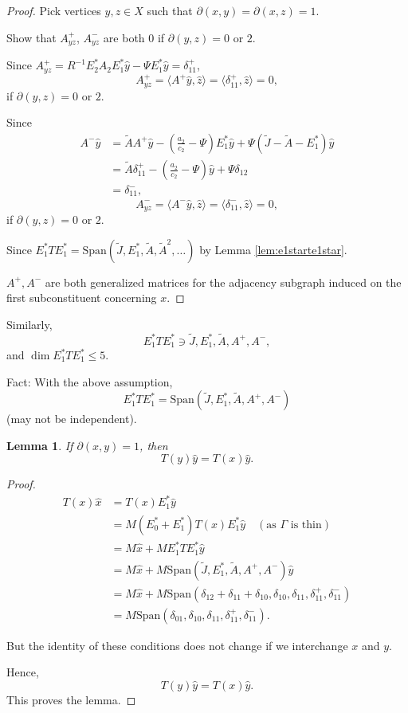 \documentclass[
]{book}
\newtheorem{lemma}{Lemma}[chapter]
\theoremstyle{definition}
\theoremstyle{definition}
\theoremstyle{definition}
\theoremstyle{definition}
\theoremstyle{remark}
\begin{document}
\begin{proof}
Pick vertices \(y,z\in X\) such that \(\partial(x,y) = \partial(x,z) = 1\).

Show that \(A^+_{yz}\), \(A^-_{yz}\) are both \(0\) if \(\partial(y,z) = 0\) or \(2\).

Since \(A^+_{yz} = R^{-1}E^*_2A_2E^*_1\hat{y} - \Psi E^*_1\hat{y} = \delta^+_{11}\),
\[A^+_{yz} = \langle A^+\hat{y}, \hat{z}\rangle = \langle \delta^+_{11},\hat{z}\rangle = 0,\]
if \(\partial(y,z) = 0\) or \(2\).

Since
\begin{align}
A^-\hat{y} & = \tilde{A}A^+\hat{y} - \left(\frac{a_2}{c_2}-\Psi\right)E^*_1\hat{y} + \Psi(\tilde{J} - \tilde{A} - E^*_1)\hat{y}\\
& = \tilde{A}\delta^+_{11} - \left(\frac{a_2}{c_2}-\Psi\right)\hat{y} + \Psi\delta_{12}\\
& = \delta^-_{11},
\end{align}
\[A^-_{yz} = \langle A^-\hat{y}, \hat{z}\rangle = \langle \delta^-_{11}, \hat{z}\rangle = 0,\]
if \(\partial(y,z) = 0\) or \(2\).

Since \(E^*_1TE^*_1 = \mathrm{Span}(\tilde{J},E^*_1, \tilde{A}, \tilde{A}^2, \ldots)\) by Lemma \ref{lem:e1starte1star}.

\(A^+, A^-\) are both generalized matrices for the adjacency subgraph induced on the first subconstituent concerning \(x\).
\end{proof}

Similarly,
\[E^*_1TE^*_1 \ni \tilde{J}, E^*_1, \tilde{A}, A^+, A^-,\]
and \(\dim E^*_1TE^*_1 \leq 5\).

Fact: With the above assumption,
\[E^*_1TE^*_1 = \mathrm{Span}(\tilde{J}, E^*_1, \tilde{A}, A^+, A^-)\]
(may not be independent).

\begin{lemma}
\protect\hypertarget{lem:tyx-equals-txy}{}\label{lem:tyx-equals-txy}If \(\partial(x,y) = 1\), then
\[T(y)\hat{y} = T(x)\hat{y}.\]
\end{lemma}

\begin{proof}
\begin{align}
T(x)\hat{x} & = T(x)E^*_1\hat{y}\\
& = M(E^*_0+E^*_1)T(x)E^*_1\hat{y} \quad (\text{as $\Gamma$ is thin})\\
& = M\hat{x} + ME^*_1TE^*_1\hat{y}\\
& = M\hat{x} + M\mathrm{Span}(\tilde{J}, E^*_1, \tilde{A}, A^+, A^-)\hat{y}\\
& = M\hat{x} + M\mathrm{Span}(\delta_{12}+\delta_{11}+\delta_{10}, \delta_{10}, \delta_{11}, \delta^+_{11}, \delta^-_{11})\\
& = M\mathrm{Span}(\delta_{01}, \delta_{10}, \delta_{11}, \delta^+_{11}, \delta^-_{11}).
\end{align}

But the identity of these conditions does not change if we interchange \(x\) and \(y\).

Hence,
\[T(y)\hat{y} = T(x)\hat{y}.\]
This proves the lemma.
\end{proof}
\end{document}
